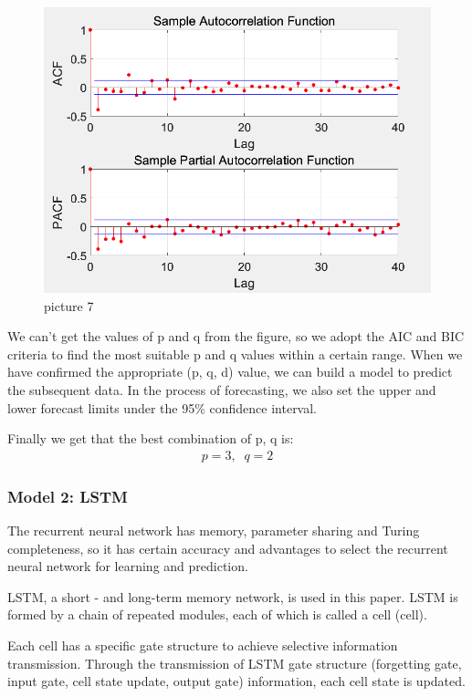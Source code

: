 \documentclass{apmcmthesis}
\begin{document}
\begin{figure}[htbp]
  \centering
  \includegraphics[scale=0.4]{ACF.png}
  \caption{picture 7}
\end{figure}

We can't get the values of p and q from the figure, so we adopt the AIC and BIC criteria to find the most suitable p and q values within a certain range. When we have confirmed the appropriate (p, q, d) value, we can build a model to predict the subsequent data. In the process of forecasting, we also set the upper and lower forecast limits under the 95\% confidence interval.

Finally we get that the best combination of p, q is:
\begin{align*}
  p=3,\;\;q=2
\end{align*}

\subsubsection{Model 2: LSTM}

The recurrent neural network has memory, parameter sharing and Turing completeness, so it has certain accuracy and advantages to select the recurrent neural network for learning and prediction.

LSTM, a short - and long-term memory network, is used in this paper. LSTM is formed by a chain of repeated modules, each of which is called a cell (cell).

Each cell has a specific gate structure to achieve selective information transmission. Through the transmission of LSTM gate structure (forgetting gate, input gate, cell state update, output gate) information, each cell state is updated.
\end{document}
